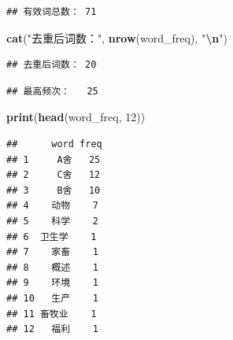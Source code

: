 \documentclass[
]{ctexart}
\newenvironment{Shaded}{\begin{snugshade}}{\end{snugshade}}
\newcommand{\DecValTok}[1]{\textcolor[rgb]{0.00,0.00,0.81}{#1}}
\newcommand{\FunctionTok}[1]{\textcolor[rgb]{0.13,0.29,0.53}{\textbf{#1}}}
\newcommand{\NormalTok}[1]{#1}
\newcommand{\SpecialCharTok}[1]{\textcolor[rgb]{0.81,0.36,0.00}{\textbf{#1}}}
\newcommand{\StringTok}[1]{\textcolor[rgb]{0.31,0.60,0.02}{#1}}
\begin{document}
\begin{verbatim}
## 有效词总数： 71
\end{verbatim}

\begin{Shaded}
\begin{Highlighting}[]
\FunctionTok{cat}\NormalTok{(}\StringTok{"去重后词数："}\NormalTok{, }\FunctionTok{nrow}\NormalTok{(word\_freq),     }\StringTok{"}\SpecialCharTok{\textbackslash{}n}\StringTok{"}\NormalTok{)}
\end{Highlighting}
\end{Shaded}

\begin{verbatim}
## 去重后词数： 20
\end{verbatim}

\begin{Shaded}
\end{Shaded}

\begin{verbatim}
## 最高频次：   25
\end{verbatim}

\begin{Shaded}
\begin{Highlighting}[]
\FunctionTok{print}\NormalTok{(}\FunctionTok{head}\NormalTok{(word\_freq, }\DecValTok{12}\NormalTok{))}
\end{Highlighting}
\end{Shaded}

\begin{verbatim}
##      word freq
## 1     A舍   25
## 2     C舍   12
## 3     B舍   10
## 4    动物    7
## 5    科学    2
## 6  卫生学    1
## 7    家畜    1
## 8    概述    1
## 9    环境    1
## 10   生产    1
## 11 畜牧业    1
## 12   福利    1
\end{verbatim}
\end{document}
